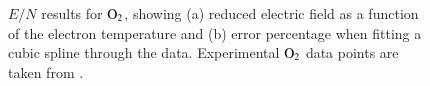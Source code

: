%
\begin{figure}[h]
\caption{$E/N$ results for $\rm O_2$, showing (a) reduced electric field as a function of the electron temperature and (b) error percentage when fitting a cubic spline through the data. Experimental $\rm O_2$ data points are taken from .}
\label{fig:electronimpact_2}
\end{figure}


